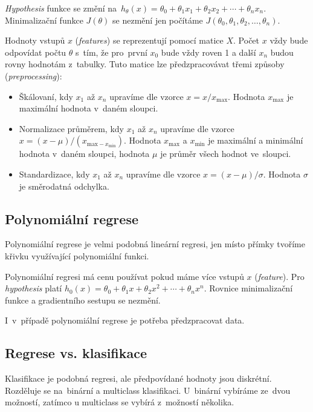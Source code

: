 \emph{Hypothesis} funkce se změní na~$h_{\theta}(x) = \theta_0 + \theta_1 x_1 + \theta_2 x_2 + \dotsb + \theta_n x_n$.
Minimalizační funkce $J(\theta)$ se nezmění jen počítáme $J(\theta_0, \theta_1, \theta_2, \dots , \theta_n)$.

Hodnoty vstupů $x$ (\emph{features}) se reprezentují pomocí matice $X$. 
Počet $x$ vždy bude odpovídat počtu $\theta$ s~tím, že pro~první $x_0$ bude vždy roven 1 a další $x_n$ budou rovny hodnotám z~tabulky.
Tuto matice lze předzpracovávat třemi způsoby (\emph{preprocessing}):
\begin{itemize}
    \item
    Škálovaní, kdy $x_1$ až $x_n$ upravíme dle vzorce $x = x/x_{\text{max}}$. 
    Hodnota $x_{\text{max}}$ je maximální hodnota v~daném sloupci.

    \item
    Normalizace průměrem, kdy $x_1$ až $x_n$ upravíme dle vzorce $x = (x - \mu)/(x_{\text{max} - x_{\text{min}}})$.
    Hodnota $x_{\text{max}}$ a $x_{\text{min}}$ je maximální a minimální hodnota v~daném sloupci, hodnota $\mu$ je průměr všech hodnot ve~sloupci.

    \item
    Standardizace, kdy $x_1$ až $x_n$ upravíme dle vzorce $x = (x - \mu)/\sigma$.
    Hodnota $\sigma$ je směrodatná odchylka.
\end{itemize}

\subsection{Polynomiální regrese}

Polynomiální regrese je velmi podobná lineární regresi, jen místo přímky tvoříme křivku využívající polynomiální funkci.

Polynomiální regresi má cenu používat pokud máme více vstupů $x$ (\emph{feature}).
Pro \emph{hypothesis} platí $h_0(x) = \theta_0 + \theta_1 x + \theta_2 x^2 + \cdots + \theta_n x^n$.
Rovnice minimalizační funkce a gradientního sestupu se nezmění.

I~v~případě polynomiální regrese je potřeba předzpracovat data.

\subsection{Regrese vs. klasifikace}

Klasifikace je podobná regresi, ale předpovídané hodnoty jsou diskrétní.
Rozděluje se na~binární a multiclass klasifikaci.
U~binární vybíráme ze~dvou možností, zatímco u multiclass se vybírá z~možností několika.

